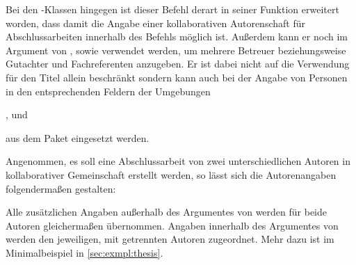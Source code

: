 \begin{Declaration*}{}
\begin{Declaration*}{}
\begin{Declaration*}{}
\begin{Declaration}{}
Bei den \TUDScript-Klassen hingegen ist dieser Befehl derart in seiner Funktion 
erweitert worden, dass damit die Angabe einer kollaborativen Autorenschaft für 
Abschlussarbeiten innerhalb des Befehls  möglich ist. Außerdem 
kann er noch im Argument von ,  sowie 
 verwendet werden, um mehrere Betreuer beziehungsweise Gutachter 
und Fachreferenten anzugeben. Er ist dabei nicht auf die Verwendung für den 
Titel allein beschränkt sondern kann auch bei der Angabe von Personen in den 
entsprechenden Feldern der Umgebungen
\begin{Bundle}{}
,  und 
\end{Bundle}
aus dem Paket  eingesetzt werden.
\end{Declaration}
%
\begin{Example}
Angenommen, es soll eine Abschlussarbeit von zwei unterschiedlichen Autoren in 
kollaborativer Gemeinschaft erstellt werden, so lässt sich die Autorenangaben 
folgendermaßen gestalten:
\begin{Code}
\author{%
  Mickey Mouse%
\and%
  Donald Duck%
}
\end{Code}
Alle zusätzlichen Angaben außerhalb des Argumentes von  werden 
für beide Autoren gleichermaßen übernommen. Angaben innerhalb des Argumentes 
von  werden den jeweiligen, mit  getrennten Autoren 
zugeordnet. Mehr dazu ist im Minimalbeispiel in \autoref{sec:exmpl:thesis}.
\end{Example}


\end{Declaration*}
\end{Declaration*}
\end{Declaration*}
